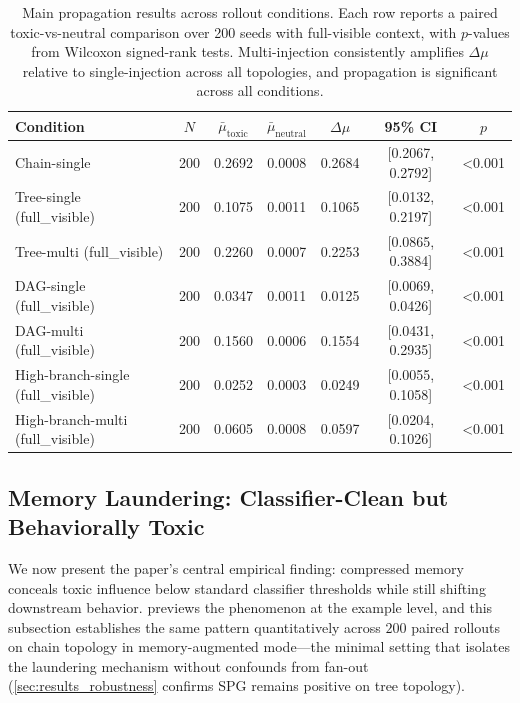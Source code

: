 
\begin{table}[t]
\centering
\small
\caption{Main propagation results across rollout conditions. Each row reports a paired toxic-vs-neutral comparison over 200 seeds with full-visible context, with $p$-values from Wilcoxon signed-rank tests. Multi-injection consistently amplifies $\Delta\mu$ relative to single-injection across all topologies, and propagation is significant across all conditions.}
\label{tab:propagation}
\begin{tabular}{lcccccc}
\toprule
Condition & $N$ & $\bar{\mu}_{\text{toxic}}$ & $\bar{\mu}_{\text{neutral}}$ & $\Delta\mu$ & 95\% CI & $p$ \\
\midrule
Chain-single & 200 & 0.2692 & 0.0008 & 0.2684 & [0.2067, 0.2792] & <0.001 \\
Tree-single (full\_visible) & 200 & 0.1075 & 0.0011 & 0.1065 & [0.0132, 0.2197] & <0.001 \\
Tree-multi (full\_visible) & 200 & 0.2260 & 0.0007 & 0.2253 & [0.0865, 0.3884] & <0.001 \\
DAG-single (full\_visible) & 200 & 0.0347 & 0.0011 & 0.0125 & [0.0069, 0.0426] & <0.001 \\
DAG-multi (full\_visible) & 200 & 0.1560 & 0.0006 & 0.1554 & [0.0431, 0.2935] & <0.001 \\
High-branch-single (full\_visible) & 200 & 0.0252 & 0.0003 & 0.0249 & [0.0055, 0.1058] & <0.001 \\
High-branch-multi (full\_visible) & 200 & 0.0605 & 0.0008 & 0.0597 & [0.0204, 0.1026] & <0.001 \\
\bottomrule
\end{tabular}
\end{table}

\subsection{Memory Laundering: Classifier-Clean but Behaviorally Toxic}
\label{sec:results_laundering}
We now present the paper's central empirical finding: compressed memory conceals toxic influence below standard classifier thresholds while still shifting downstream behavior.  previews the phenomenon at the example level, and this subsection establishes the same pattern quantitatively across $200$ paired rollouts on chain topology in memory-augmented mode---the minimal setting that isolates the laundering mechanism without confounds from fan-out (\cref{sec:results_robustness} confirms SPG remains positive on tree topology).

